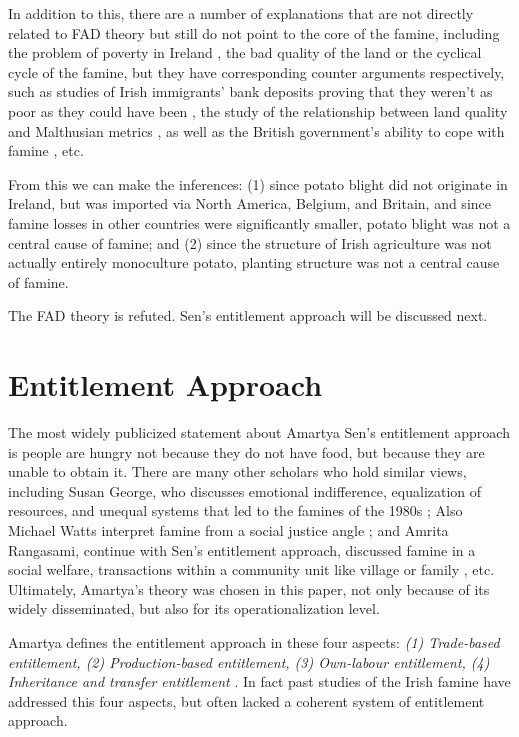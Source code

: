 In addition to this, there are a number of explanations that are not directly related to FAD theory but still do not point to the core of the famine, including the problem of poverty in Ireland \citep{gilleard2016other, gray2010irish}, the bad quality of the land \citep{whelan2012clachans} or the cyclical cycle of the famine, but they have corresponding counter arguments respectively, such as studies of Irish immigrants' bank deposits proving that they weren't as poor as they could have been \citep{wegge2017immigrants}, the study of the relationship between land quality and Malthusian metrics \citep{donnelly2002great}, as well as the British government's ability to cope with famine \citep{kelly2015ireland}, etc.

From this we can make the inferences: (1) since potato blight did not originate in Ireland, but was imported via North America, Belgium, and Britain, and since famine losses in other countries were significantly smaller, potato blight was not a central cause of famine; and (2) since the structure of Irish agriculture was not actually entirely monoculture potato, planting structure was not a central cause of famine.

The FAD theory is refuted. Sen's entitlement approach will be discussed next.

\section{Entitlement Approach}

The most widely publicized statement about Amartya Sen's entitlement approach is people are hungry not because they do not have food, but because they are unable to obtain it. There are many other scholars who hold similar views, including Susan George, who discusses emotional indifference, equalization of resources, and unequal systems that led to the famines of the 1980s \citep{george1990ill}; Also Michael Watts interpret famine from a social justice angle \citep{watts2013silent}; and Amrita Rangasami, continue with Sen's entitlement approach, discussed famine in a social welfare, transactions within a community unit like village or family \citep{rangasami1985failure}, etc. Ultimately, Amartya's theory was chosen in this paper, not only because of its widely disseminated, but also for its operationalization level.

Amartya defines the entitlement approach in these four aspects: \textit{(1) Trade-based entitlement, (2) Production-based entitlement, (3) Own-labour entitlement, (4) Inheritance and transfer entitlement} \citep{sen1982poverty}. In fact past studies of the Irish famine have addressed this four aspects, but often lacked a coherent system of entitlement approach.

